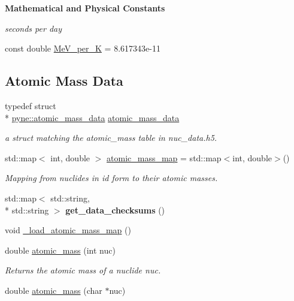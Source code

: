 \begin{Indent}{\bf Mathematical and Physical Constants}
\begin{DoxyCompactItemize}
\begin{DoxyCompactList}\small\item\em seconds per day \end{DoxyCompactList}\item 
const double \hyperlink{namespacepyne_af4fb3aac22e7bda0ece3bcf515151611}{Me\-V\-\_\-per\-\_\-\-K} = 8.\-617343e-\/11
\end{DoxyCompactItemize}
\end{Indent}
\subsection*{Atomic Mass Data}
\begin{DoxyCompactItemize}
\item 
\hypertarget{namespacepyne_a4d33f77321c43a895b32c56b0c4b9256}{typedef struct \\*
\hyperlink{structpyne_1_1atomic__mass__data}{pyne\-::atomic\-\_\-mass\-\_\-data} \hyperlink{namespacepyne_a4d33f77321c43a895b32c56b0c4b9256}{atomic\-\_\-mass\-\_\-data}}\label{namespacepyne_a4d33f77321c43a895b32c56b0c4b9256}

\begin{DoxyCompactList}\small\item\em a struct matching the atomic\-\_\-mass table in nuc\-\_\-data.\-h5. \end{DoxyCompactList}\item 
\hypertarget{namespacepyne_ad57b70e4dd814b1efc458ff58641bcef}{std\-::map$<$ int, double $>$ \hyperlink{namespacepyne_ad57b70e4dd814b1efc458ff58641bcef}{atomic\-\_\-mass\-\_\-map} = std\-::map$<$int, double$>$()}\label{namespacepyne_ad57b70e4dd814b1efc458ff58641bcef}

\begin{DoxyCompactList}\small\item\em Mapping from nuclides in id form to their atomic masses. \end{DoxyCompactList}\item 
\hypertarget{namespacepyne_a7ffac869653ccaac71a565704630ae43}{std\-::map$<$ std\-::string, \\*
std\-::string $>$ {\bfseries get\-\_\-data\-\_\-checksums} ()}\label{namespacepyne_a7ffac869653ccaac71a565704630ae43}

\item 
void \hyperlink{namespacepyne_afc84ecca5a23b416bd3bf42b0756e68e}{\-\_\-load\-\_\-atomic\-\_\-mass\-\_\-map} ()
\item 
double \hyperlink{namespacepyne_aaab79c2417fc60c1a248dd702403befb}{atomic\-\_\-mass} (int nuc)
\begin{DoxyCompactList}\small\item\em Returns the atomic mass of a nuclide {\itshape nuc}. \end{DoxyCompactList}\item 
\hypertarget{namespacepyne_a070a35bbdb0217ff8c4b222572912f87}{double \hyperlink{namespacepyne_a070a35bbdb0217ff8c4b222572912f87}{atomic\-\_\-mass} (char $\ast$nuc)}\label{namespacepyne_a070a35bbdb0217ff8c4b222572912f87}


\end{DoxyCompactItemize}
